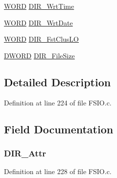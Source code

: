 \begin{DoxyCompactItemize}
\item 
\hyperlink{_generic_type_defs_8h_a2b0e863dadf920709ec53d9088ee7c91}{W\+O\+R\+D} \hyperlink{struct___d_i_r_e_n_t_r_y_a8aae2bce5f7e9091d69dd62e67108559}{D\+I\+R\+\_\+\+Wrt\+Time}
\item 
\hyperlink{_generic_type_defs_8h_a2b0e863dadf920709ec53d9088ee7c91}{W\+O\+R\+D} \hyperlink{struct___d_i_r_e_n_t_r_y_a8c46e5fb2ff2549802ed0b2c98f9d074}{D\+I\+R\+\_\+\+Wrt\+Date}
\item 
\hyperlink{_generic_type_defs_8h_a2b0e863dadf920709ec53d9088ee7c91}{W\+O\+R\+D} \hyperlink{struct___d_i_r_e_n_t_r_y_a280c3c280d6f1286b8dc4c009d45949a}{D\+I\+R\+\_\+\+Fst\+Clus\+L\+O}
\item 
\hyperlink{_generic_type_defs_8h_ad342ac907eb044443153a22f964bf0af}{D\+W\+O\+R\+D} \hyperlink{struct___d_i_r_e_n_t_r_y_a3dadf1cd73646d30433f3e8067aedd45}{D\+I\+R\+\_\+\+File\+Size}
\end{DoxyCompactItemize}


\subsection{Detailed Description}


Definition at line 224 of file F\+S\+I\+O.\+c.



\subsection{Field Documentation}
\hypertarget{struct___d_i_r_e_n_t_r_y_a135fb39a2f8df21153b95046f758aed4}{}
\subsubsection[{D\+I\+R\+\_\+\+Attr}]{ D\+I\+R\+\_\+\+Attr}\label{struct___d_i_r_e_n_t_r_y_a135fb39a2f8df21153b95046f758aed4}


Definition at line 228 of file F\+S\+I\+O.\+c.

\hypertarget{struct___d_i_r_e_n_t_r_y_a0c839078c5efd521c5932fc5265e801f}{}
